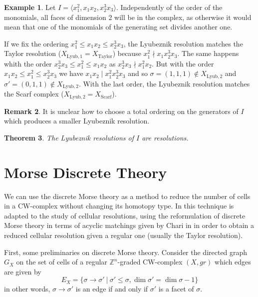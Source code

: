 \documentclass[paper=a4, fontsize=11pt]{scrartcl} %
\theoremstyle{plain}
\newtheorem{thm}{Theorem}[section]
\theoremstyle{definition}
\newtheorem{exmp}[thm]{Example}
\newtheorem{remk}[thm]{Remark}
\begin{document}
\begin{exmp}
Let $I = \langle x_{1}^2, x_{1} x_{2}, x_{2}^3 x_{3} \rangle$. Independently of the order of the monomials, all faces of dimension 2 will be in the complex, as otherwise it would mean that one of the monomials of the generating set divides another one.

If we fix the ordering $x_{1}^2 \leq x_{1} x_{2} \leq x_{2}^3 x_3$, the Lyubeznik resolution matches the Taylor resolution ($X_{\text{Lyub},1} = X_{\text{Taylor}}$) because $x_{1}^2 \nmid x_{1} x_{2}^3 x_3$. The same happens whith the order  $x_{2}^3 x_3 \leq x_{1}^2 \leq x_{1} x_{2}$ as $x_{2}^3 x_3 \nmid x_{1}^2 x_{2}$. But with the order $x_{1} x_{2} \leq x_{1}^2 \leq x_{2}^3 x_3$ we have $x_{1} x_{2} \mid x_{1}^2 x_{2}^3 x_3$ and so $\sigma = (1,1,1) \notin X_{\text{Lyub},2}$ and $\sigma ' = (0,1,1) \notin X_{\text{Lyub},2}$. With the last order, the Lyubeznik resolution matches the Scarf complex ($X_{\text{Lyub},2} = X_{\text{Scarf}}$).
\end{exmp}

\begin{remk}
It is unclear how to choose a total ordering on the generators of $I$ which produces a smaller Lyubeznik resolution.
\end{remk}

\begin{thm}
The Lyubeznik resolutions of $I$ are resolutions.
\end{thm}

\section{Morse Discrete Theory}

We can use the discrete Morse theory as a method to reduce the number of cells in a CW-complex without changing its homotopy type. In \cite{BaWe02} this technique is adapted to the study of cellular resolutions, using the reformulation of discrete Morse theory in terms of acyclic matchings given by Chari in \cite{Ch00} in order to obtain a reduced cellular resolution given a regular one (usually the Taylor resolution).

First, some preliminaries on discrete Morse theory. Consider the directed graph $G_X$ on the set of cells of a regular $\mathbb{Z}^n$-graded CW-complex $(X,gr)$ which edges are given by $$E_X = \lbrace \sigma \longrightarrow \sigma ' \ \vert \ \sigma ' \leq \sigma, \dim \sigma ' = \dim \sigma -1 \rbrace$$
in other words, $\sigma \longrightarrow \sigma '$ is an edge if and only if $\sigma '$ is a facet of $\sigma$.
\end{document}

